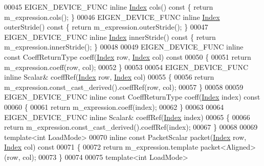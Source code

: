 \begin{DoxyCode}
00045     EIGEN\_DEVICE\_FUNC \textcolor{keyword}{inline} \hyperlink{namespace_eigen_a62e77e0933482dafde8fe197d9a2cfde}{Index} cols()\textcolor{keyword}{ const }\{ \textcolor{keywordflow}{return} m\_expression.cols(); \}
00046     EIGEN\_DEVICE\_FUNC \textcolor{keyword}{inline} \hyperlink{namespace_eigen_a62e77e0933482dafde8fe197d9a2cfde}{Index} outerStride()\textcolor{keyword}{ const }\{ \textcolor{keywordflow}{return} m\_expression.outerStride(); \}
00047     EIGEN\_DEVICE\_FUNC \textcolor{keyword}{inline} \hyperlink{namespace_eigen_a62e77e0933482dafde8fe197d9a2cfde}{Index} innerStride()\textcolor{keyword}{ const }\{ \textcolor{keywordflow}{return} m\_expression.innerStride(); \}
00048 
00049     EIGEN\_DEVICE\_FUNC \textcolor{keyword}{inline} \textcolor{keyword}{const} CoeffReturnType coeff(\hyperlink{namespace_eigen_a62e77e0933482dafde8fe197d9a2cfde}{Index} row, \hyperlink{namespace_eigen_a62e77e0933482dafde8fe197d9a2cfde}{Index} col)\textcolor{keyword}{ const}
00050 \textcolor{keyword}{    }\{
00051       \textcolor{keywordflow}{return} m\_expression.coeff(row, col);
00052     \}
00053 
00054     EIGEN\_DEVICE\_FUNC \textcolor{keyword}{inline} Scalar& coeffRef(\hyperlink{namespace_eigen_a62e77e0933482dafde8fe197d9a2cfde}{Index} row, \hyperlink{namespace_eigen_a62e77e0933482dafde8fe197d9a2cfde}{Index} col)
00055     \{
00056       \textcolor{keywordflow}{return} m\_expression.const\_cast\_derived().coeffRef(row, col);
00057     \}
00058 
00059     EIGEN\_DEVICE\_FUNC \textcolor{keyword}{inline} \textcolor{keyword}{const} CoeffReturnType coeff(\hyperlink{namespace_eigen_a62e77e0933482dafde8fe197d9a2cfde}{Index} index)\textcolor{keyword}{ const}
00060 \textcolor{keyword}{    }\{
00061       \textcolor{keywordflow}{return} m\_expression.coeff(index);
00062     \}
00063 
00064     EIGEN\_DEVICE\_FUNC \textcolor{keyword}{inline} Scalar& coeffRef(\hyperlink{namespace_eigen_a62e77e0933482dafde8fe197d9a2cfde}{Index} index)
00065     \{
00066       \textcolor{keywordflow}{return} m\_expression.const\_cast\_derived().coeffRef(index);
00067     \}
00068 
00069     \textcolor{keyword}{template}<\textcolor{keywordtype}{int} LoadMode>
00070     \textcolor{keyword}{inline} \textcolor{keyword}{const} PacketScalar packet(\hyperlink{namespace_eigen_a62e77e0933482dafde8fe197d9a2cfde}{Index} row, \hyperlink{namespace_eigen_a62e77e0933482dafde8fe197d9a2cfde}{Index} col)\textcolor{keyword}{ const}
00071 \textcolor{keyword}{    }\{
00072       \textcolor{keywordflow}{return} m\_expression.template packet<Aligned>(row, col);
00073     \}
00074 
00075     \textcolor{keyword}{template}<\textcolor{keywordtype}{int} LoadMode>

\end{DoxyCode}
